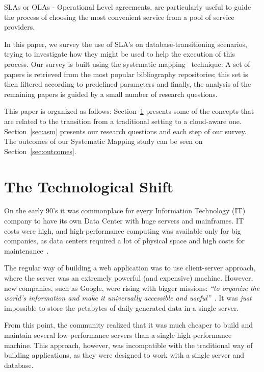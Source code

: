 \documentclass{article}
\begin{document}
SLAs or OLAs - Operational Level agreements, are particularly useful to guide the process of choosing the most convenient service from a pool of service providers.

In this paper, we survey the use of SLA's on database-transitioning scenarios, trying to investigate how they might be used to help the execution of this process.
Our survey is built using the systematic mapping~\cite{Petersen:2008:SMS:2227115.2227123} technique: A set of papers is retrieved from the most popular bibliography repositories; this set is then filtered according to predefined parameters and finally, the analysis of the remaining papers is guided by a small number of research questions.

\bigskip

This paper is organized as follows: 
Section~\ref{sec:tts} presents some of the concepts that are related to the transition from a traditional setting to a cloud-aware one.
Section~\ref{sec:asm} presents our research questions and each step of our survey. The outcomes of our Systematic Mapping study can be seen on Section~\ref{sec:outcomes}.

\section{The Technological Shift}
\label{sec:tts}


On the early 90's it was commonplace for every Information Technology (IT) company to have its own Data Center with huge servers and mainframes. 
IT costs were high, and high-performance computing was available only for big companies, as data centers required a lot of physical space and high costs for maintenance~\cite{Armbrust09m.:above}.

The regular way of building a web application was to use client-server approach, where the server was an extremely powerful (and expensive) machine. 
However, new companies, such as Google, were rising with bigger missions: \textit{``to organize the world's information and make it universally accessible and useful''}~\cite{Spector:2012:GHA:2209249.2209262}. 
It was \textit{just} impossible to store the petabytes of daily-generated data in a single server. 

From this point, the community realized that it was much cheaper to build and maintain several low-performance servers than a single high-performance machine.
This approach, however, was incompatible with the traditional way of building applications, as they were designed to work with a single server and database. 
\end{document}
